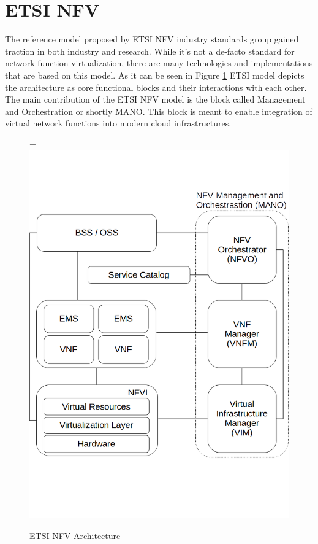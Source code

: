 \documentclass[12pt,oneandhalf,chaparabic,ceng,ms,eng,oneside,pntc]{gsufbe}
\makeatletter
\let\old@includegraphics\includegraphics
\renewcommand{\includegraphics}[2][,]{%
  \setbox9=\hbox{\old@includegraphics[#1]{#2}}%
  \ifdim\wd9>\textwidth
    \old@includegraphics[#1,width=\textwidth]{#2}%
  \else
    \old@includegraphics[#1]{#2}%
  \fi%
}
\makeatother
\begin{document}
\section{ETSI NFV}
The reference model proposed by ETSI NFV industry standards group gained traction in both industry and
research. While it's not a de-facto standard for network function virtualization, there are many
technologies and implementations that are based on this model. As it can be seen in Figure \ref{fig:mano}
ETSI model depicts the architecture as core functional blocks and their interactions with each other. 
The main contribution of the ETSI NFV model is the block called Management and Orchestration or shortly
MANO. This block is meant to enable integration of virtual network functions into modern cloud
infrastructures.

\begin{figure}
\centering
\includegraphics[]{mano.png}
\caption{ETSI NFV Architecture}
\label{fig:mano}
\end{figure}
\end{document}
